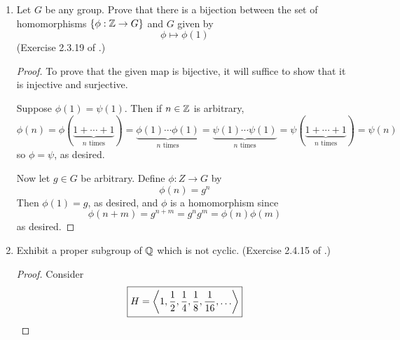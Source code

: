 \documentclass[../psets.tex]{subfiles}
\begin{document}
\begin{enumerate}
\begin{enumerate}
\begin{proof}
            Now suppose for the sake of contradiction that $g^a=g^b$ for some distinct $0\leq a,b<n$ with $a>b$ WLOG. Then $g^{a-b}=e$, so $|G|\leq a-b<n$, a contradiction. Therefore, we may once again define $\phi:\Z/n\Z\to G$ as above. Note that $a+b\mapsto g^{(a+b)\mod n}$. This is still a homomorphism, though.
        \end{proof}
        \item Let $G$ be any group. Prove that there is a bijection between the set of homomorphisms $\{\phi:\mathbb{Z}\to G\}$ and $G$ given by
        \begin{equation*}
            \phi \mapsto \phi(1)
        \end{equation*}
        (Exercise 2.3.19 of \textcite{bib:DummitFoote}.)
        \begin{proof}
            To prove that the given map is bijective, it will suffice to show that it is injective and surjective.\par
            Suppose $\phi(1)=\psi(1)$. Then if $n\in\mathbb{Z}$ is arbitrary,
            \begin{equation*}
                \phi(n) = \phi(\underbrace{1+\cdots+1}_{n\text{ times}})
                = \underbrace{\phi(1)\cdots\phi(1)}_{n\text{ times}}
                = \underbrace{\psi(1)\cdots\psi(1)}_{n\text{ times}}
                = \psi(\underbrace{1+\cdots+1}_{n\text{ times}})
                = \psi(n)
            \end{equation*}
            so $\phi=\psi$, as desired.\par
            Now let $g\in G$ be arbitrary. Define $\phi:Z\to G$ by
            \begin{equation*}
                \phi(n) = g^n
            \end{equation*}
            Then $\phi(1)=g$, as desired, and $\phi$ is a homomorphism since
            \begin{equation*}
                \phi(n+m) = g^{n+m}
                = g^ng^m
                = \phi(n)\phi(m)
            \end{equation*}
            as desired.
        \end{proof}
        \item Exhibit a proper subgroup of $\mathbb{Q}$ which is not cyclic. (Exercise 2.4.15 of \textcite{bib:DummitFoote}.)
        \begin{proof}
            Consider
            \begin{equation*}
                \boxed{H = \gen{1,\frac{1}{2},\frac{1}{4},\frac{1}{8},\frac{1}{16},\dots}}

\end{equation*}
\end{proof}
\end{enumerate}
\end{enumerate}
\end{document}
